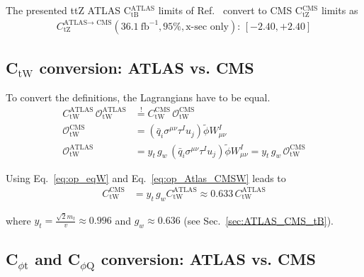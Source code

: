\documentclass[letterpaper,11pt]{article}
\begin{document}
The presented ttZ ATLAS C$_\text{tB}^\text{ATLAS}$ limits of Ref.~\cite{ATLAS:Top2018} convert to CMS C$_\text{tZ}^\text{CMS}$ limits as
\begin{align}
	C_\text{tZ}^\text{ATLAS$\rightarrow$ CMS}(36.1~\text{fb}^{-1}, 95\%, \text{x-sec only}):\, [-2.40,+2.40]
\end{align}


\subsection{C$_\text{tW}$ conversion: ATLAS vs. CMS}
\label{sec:ATLAS_CMS_tW}

To convert the definitions, the Lagrangians have to be equal.
\begin{align}
	C_\text{tW}^\text{ATLAS}\,\mathcal{O}^\text{ATLAS}_\text{tW} &\stackrel{!}{=} C_\text{tW}^\text{CMS}\,\mathcal{O}^\text{CMS}_\text{tW}\label{eq:op_eqW}\\
	\mathcal{O}^\text{CMS}_\text{tW} &= (\bar{q}_i\sigma^{\mu\nu}\tau^Iu_j)\tilde{\phi}W_{\mu\nu}^I\\
	\mathcal{O}^\text{ATLAS}_\text{tW} &= y_t\,g_w\,(\bar{q}_i\sigma^{\mu\nu}\tau^Iu_j)\tilde{\phi}W_{\mu\nu}^I = y_t\,g_w\,\mathcal{O}^\text{CMS}_\text{tW}\label{eq:op_Atlas_CMSW}
\end{align}

\noindent
Using Eq.~\ref{eq:op_eqW} and Eq.~\ref{eq:op_Atlas_CMSW} leads to
\begin{align}
	C_\text{tW}^\text{CMS} &= y_t\,g_w C_\text{tW}^\text{ATLAS} \approx 0.633 \, C_\text{tW}^\text{ATLAS}
\end{align}

\noindent
where $y_t=\frac{\sqrt{2}m_t}{v}\approx 0.996$ and $g_w \approx 0.636$ (see Sec.~\ref{sec:ATLAS_CMS_tB}).\\

\noindent
{}

\subsection{C$_{\phi\text{t}}$ and C$_{\phi\text{Q}}$ conversion: ATLAS vs. CMS}
\label{sec:ATLAS_CMS_pQ}

\end{document}
